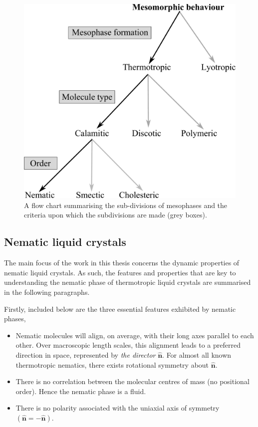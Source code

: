 \begin{figure}
\begin{center}
\includegraphics{figures/introduction/flow_chart.pdf}
\end{center}
\caption[Mesophase sub-division flow chart]{\label{fig:flow_chart}A flow chart summarising the sub-divisions of mesophases and the criteria upon which the subdivisions are made (grey boxes).}
\begin{center}
\end{center}
\end{figure}

\subsection{Nematic liquid crystals}
\label{sec:nematic_mesophase}
The main focus of the work in this thesis concerns the dynamic properties of nematic liquid crystals. As such, the features and properties that are key to understanding the nematic phase of thermotropic liquid crystals are summarised in the following paragraphs.

Firstly, included below are the three essential features exhibited by nematic phases,

\begin{itemize}
\item Nematic molecules will align, on average, with their long axes parallel to each other. Over macroscopic length scales, this alignment leads to a preferred direction in space, represented by \textit{the director} $\hat{\bm{n}}$. For almost all known thermotropic nematics, there exists rotational symmetry about $\hat{\bm{n}}$.
\item There is no correlation between the molecular centres of mass (no positional order). Hence the nematic phase is a fluid.
\item There is no polarity associated with the uniaxial axis of symmetry $\left(\hat{\bm{n}}=-\hat{\bm{n}}\right)$.
\end{itemize}

